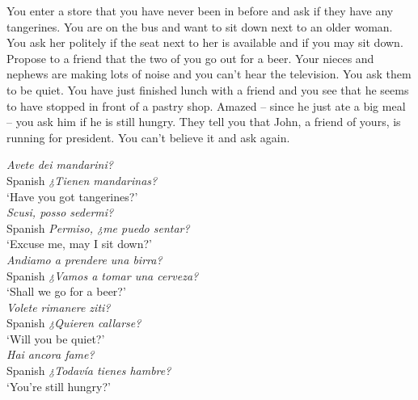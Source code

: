 {\begin{exe}
 You enter a store that you have never been in before and ask if they have any tangerines.
 You are on the bus and want to sit down next to an older woman. You ask her politely if the seat next to her is available and if you may sit down.
 Propose to a friend that the two of you go out for a beer.
 Your nieces and nephews are making lots of noise and you can’t hear the television. You ask them to be quiet.
 You have just finished lunch with a friend and you see that he seems to have stopped in front of a pastry shop. Amazed -- since he just ate a big meal -- you ask him if he is still hungry.
 They tell you that John, a friend of yours, is running for president. You can’t believe it and ask again.
\end{exe}}



\ea\label{ex:4:8}     \textit{Avete dei mandarini?}\\
Spanish   \textit{¿Tienen mandarinas?}\\
{}      {‘Have you got tangerines?’}\\



\ex\label{ex:4:9}     \textit{Scusi, posso sedermi?}\\
Spanish   \textit{Permiso, ¿me puedo sentar?}\\
{}      {‘Excuse me, may I sit down?’}\\



\ex\label{ex:4:10}     \textit{Andiamo a prendere una birra?}\\
Spanish   \textit{¿Vamos a tomar una cerveza?}\\
{}      {‘Shall we go for a beer?’}\\



\ex\label{ex:4:11}     \textit{Volete rimanere ziti?}\\
Spanish   \textit{¿Quieren callarse?}\\
{}      {‘Will you be quiet?'}\\



\ex\label{ex:4:12}     \textit{Hai ancora fame?}\\
Spanish   \textit{¿Todavía tienes hambre?}\\
{}      {‘You’re still hungry?’}\\



